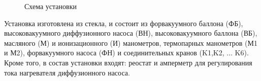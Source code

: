 \documentclass[a4paper,12pt]{article}
\begin{document}
    \begin{figure}[!ht]
		\caption{Схема установки}
	\end{figure}

    Установка изготовлена из стекла, и состоит из форвакуумного баллона (ФБ), высоковакуумного диффузионного насоса (ВН), высоковакуумного баллона (ВБ), масляного (М) и ионизационного (И) манометров, термопарных манометров (М1 и М2), форвакуумного насоса (ФН) и соединительных кранов (K1,K2, ... K6). Кроме того, в состав установки входят: реостат и амперметр для регулирования тока нагревателя диффузионного насоса.
	
\end{document}
